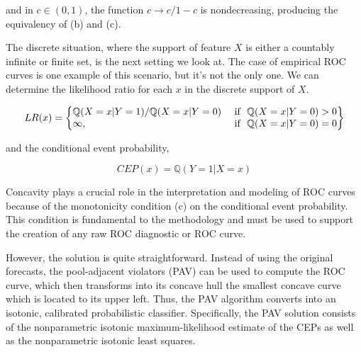 \documentclass[a4paper,12pt]{article}
\numberwithin{equation}{section}
\begin{document}
   and in $c \in (0, 1)$, the function $c \rightarrow {c}/{1-c} $ is nondecreasing, producing the equivalency of (b) and (c).\bigskip

   The discrete situation, where the support of feature $X$ is either a countably infinite or finite set, is the next setting we look at. The case of empirical ROC curves is one example of this scenario, but it's not the only one. We can determine the likelihood ratio for each $x$ in the discrete support of $X$.
   
   \begin{equation} \label{e:sqasduared} 
         LR(x) = \left\{\begin{array}{@{}lr@{}}
            \mathbb{Q}(X = x|Y=1)/\mathbb{Q}(X = x|Y=0) & \text{ if } \ \mathbb{Q}(X = x|Y=0)>0\\
            \infty, & \text{ if } \ \mathbb{Q}(X = x|Y=0)=0
             \end{array}\right\}
      \end{equation}
      
   
   and the conditional event probability,

   \begin{equation} \label{e:con_prob} 
   CEP(x) = \mathbb{Q}(Y = 1 | X = x)
   \end{equation}

   Concavity plays a crucial role in the interpretation and modeling of ROC curves because of the monotonicity condition (c) on the conditional event probability. This condition is fundamental to the methodology and must be used to support the creation of any raw ROC diagnostic or ROC curve.\bigskip
   
   However, the solution is quite straightforward. Instead of using the original forecasts, the pool-adjacent violators (PAV) can be used to compute the ROC curve, which then transforms into its concave hull the smallest concave curve which is located to its upper left. Thus, the PAV algorithm converts into an isotonic, calibrated probabilistic classifier. Specifically, the PAV solution consists of the nonparametric isotonic maximum-likelihood estimate of the CEPs as well as the nonparametric isotonic least squares.
\end{document}

